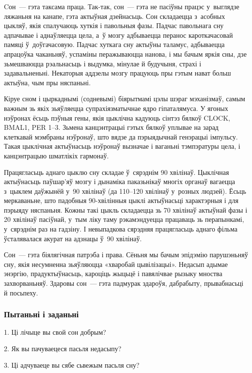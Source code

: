 Cон~--- гэта таксама праца. Так-так, сон~--- гэта не пасіўны працэс у~выглядзе ляжаньня на канапе, гэта актыўная дзейнасьць. Сон складаецца з~асобных цыкляў, якія спалучаюць хуткія і павольныя фазы. Падчас павольнага сну адпачывае і аднаўляецца цела, а~ў мозгу адбываецца перанос кароткачасовай памяці ў~доўгачасовую. Падчас хуткага сну актыўны таламус, адбываецца апрацоўка чаканьняў, успаміны перажываюцца нанова, і мы бачым яркія сны, дзе зьмешваюцца рэальнасьць і выдумка, мінулае й будучыня, страхі і задавальненьні. Некаторыя аддзелы мозгу працуюць пры гэтым нават больш актыўна, чым пры няспаньні.

Кіруе сном і цыркаднымі (содневымі) біярытмамі цэлы шэраг мэханізмаў, самым важным зь якіх зьяўляецца супрахіязматычнае ядро гіпаталямуса. У ягоных нэўронах ёсьць пэўныя гены, якія цыклічна кадуюць сінтэз бялкоў CLOCK, BMAL1, PER 1--3. Зьмена канцэнтрацыі гэтых бялкоў уплывае на зарад клеткавай мэмбраны нэўронаў, што вядзе да пэрыядычнай генэрацыі імпульсу. Такая цыклічная актыўнасьць нэўронаў вызначае і ваганьні тэмпэратуры цела, і канцэнтрацыю шматлікіх гармонаў.

Працягласьць аднаго цыклю сну складае ў~сярэднім 90 хвілінаў. Цыклічная актыўнасьць паўшар'яў мозгу і дынаміка паказьнікаў многіх органаў вагаецца з~цыклем даўжынёй у~90 хвілінаў (да 110--120 хвілінаў у~розных людзей). Ёсьць меркаваньне, што падобныя 90-хвілінныя цыклі актыўнасьці характэрныя і для пэрыяду няспаньня. Кожны такі цыкль складаецца зь 70 хвілінаў актыўнай фазы і 20 хвілінаў пасіўнай, у~тым ліку таму рэкамэндуецца працаваць зь перапынкамі, у~сярэднім раз на гадзіну. І невыпадкова сярэдняя працягласьць аднаго фільма ўсталявалася акурат на адзнацы ў~90 хвілінаў.

Сон~--- гэта біялягічная патрэба і права. Сёньня мы бачым эпідэмію парушэньняў сну, якія несумненна зьяўляюцца «хваробай цывілізацыі». Недасып адымае энэргію, прадуктыўнасьць, кароціць жыцьцё і павялічвае рызыку мноства захворваньняў. Здаровы сон~--- гэта падмурак здароўя, дабрабыту, прывабнасьці й посьпеху.

\subsubsection{Пытаньні і заданьні}

1. Ці лічыце вы свой сон добрым?

2. Як вы пачуваецеся пасьля недасыпу?

3. Ці адчуваеце вы сябе сьвежым пасьля сну?



